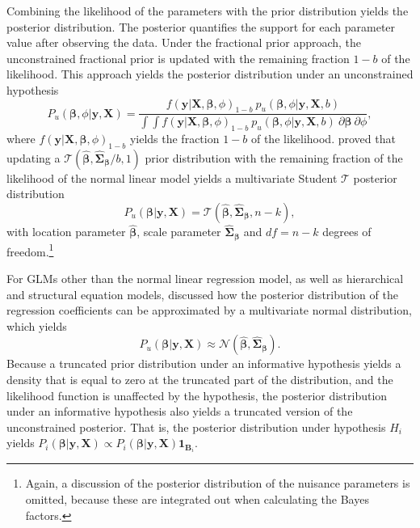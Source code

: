 \documentclass[
]{article}
\begin{document}
Combining the likelihood of the parameters with the prior distribution
yields the posterior distribution. The posterior quantifies the support
for each parameter value after observing the data. Under the fractional
prior approach, the unconstrained fractional prior is updated with the
remaining fraction \(1-b\) of the likelihood. This approach yields the
posterior distribution under an unconstrained hypothesis \[
P_u(\boldsymbol{\beta}, \phi | \boldsymbol{y}, \boldsymbol{X}) = 
\frac{
f(\boldsymbol{y} | \boldsymbol{X}, \boldsymbol{\beta}, \phi)_{1-b} ~ p_u(\boldsymbol{\beta}, \phi | \boldsymbol{y}, \boldsymbol{X}, b)
}{
\int \int f(\boldsymbol{y} | \boldsymbol{X}, \boldsymbol{\beta}, \phi)_{1-b} ~ p_u(\boldsymbol{\beta}, \phi | \boldsymbol{y}, \boldsymbol{X}, b) ~ \partial \boldsymbol{\beta} ~ \partial \phi
},
\] where
\(f(\boldsymbol{y} | \boldsymbol{X}, \boldsymbol{\beta}, \phi)_{1-b}\)
yields the fraction \(1-b\) of the likelihood.
\citet{mulder_olssoncollentine_2019} proved that updating a
\(\mathcal{T}(\boldsymbol{\hat{\beta}}, \boldsymbol{\hat{\Sigma}_\beta} / b, 1)\)
prior distribution with the remaining fraction of the likelihood of the
normal linear model yields a multivariate Student \(\mathcal{T}\)
posterior distribution \[
P_u(\boldsymbol{\beta} | \boldsymbol{y}, \boldsymbol{X}) = \mathcal{T}(\boldsymbol{\hat{\beta}}, \boldsymbol{\hat{\Sigma}_\beta}, n - k),
\] with location parameter \(\boldsymbol{\hat{\beta}}\), scale parameter
\(\boldsymbol{\hat{\Sigma}_{\beta}}\) and \(df = n - k\) degrees of
freedom.\footnote{Again, a discussion of the posterior distribution of
  the nuisance parameters is omitted, because these are integrated out
  when calculating the Bayes factors.}

For GLMs other than the normal linear regression model, as well as
hierarchical and structural equation models,
\citet{gu_approximated_2018} discussed how the posterior distribution of
the regression coefficients can be approximated by a multivariate normal
distribution, which yields \[
P_u(\boldsymbol{\beta} | \boldsymbol{y}, \boldsymbol{X}) \approx \mathcal{N}(\boldsymbol{\hat{\beta}}, \boldsymbol{\hat{\Sigma}_\beta}).
\] Because a truncated prior distribution under an informative
hypothesis yields a density that is equal to zero at the truncated part
of the distribution, and the likelihood function is unaffected by the
hypothesis, the posterior distribution under an informative hypothesis
also yields a truncated version of the unconstrained posterior. That is,
the posterior distribution under hypothesis \(H_i\) yields
\(P_i(\boldsymbol{\beta} | \boldsymbol{y}, \boldsymbol{X}) \propto P_i(\boldsymbol{\beta} | \boldsymbol{y}, \boldsymbol{X})\boldsymbol{1}_{\boldsymbol{B}_i}\).
\end{document}
